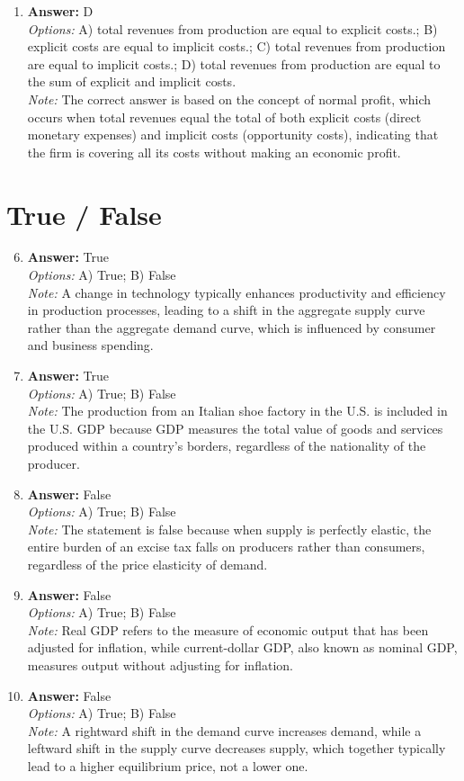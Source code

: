 \documentclass[12pt]{article}
\begin{document}
\begin{enumerate}[label=\arabic*.]
\item \textbf{Answer:} D
\\ \textit{Options:} A) total revenues from production are equal to explicit costs.; B) explicit costs are equal to implicit costs.; C) total revenues from production are equal to implicit costs.; D) total revenues from production are equal to the sum of explicit and implicit costs.
\\ \textit{Note:} The correct answer is based on the concept of normal profit, which occurs when total revenues equal the total of both explicit costs (direct monetary expenses) and implicit costs (opportunity costs), indicating that the firm is covering all its costs without making an economic profit.
\end{enumerate}

\section*{True / False}
\begin{enumerate}[label=\arabic*.]
\setcounter{enumi}{5}
\item \textbf{Answer:} True
\\ \textit{Options:} A) True; B) False
\\ \textit{Note:} A change in technology typically enhances productivity and efficiency in production processes, leading to a shift in the aggregate supply curve rather than the aggregate demand curve, which is influenced by consumer and business spending.
\item \textbf{Answer:} True
\\ \textit{Options:} A) True; B) False
\\ \textit{Note:} The production from an Italian shoe factory in the U.S. is included in the U.S. GDP because GDP measures the total value of goods and services produced within a country's borders, regardless of the nationality of the producer.
\item \textbf{Answer:} False
\\ \textit{Options:} A) True; B) False
\\ \textit{Note:} The statement is false because when supply is perfectly elastic, the entire burden of an excise tax falls on producers rather than consumers, regardless of the price elasticity of demand.
\item \textbf{Answer:} False
\\ \textit{Options:} A) True; B) False
\\ \textit{Note:} Real GDP refers to the measure of economic output that has been adjusted for inflation, while current-dollar GDP, also known as nominal GDP, measures output without adjusting for inflation.
\item \textbf{Answer:} False
\\ \textit{Options:} A) True; B) False
\\ \textit{Note:} A rightward shift in the demand curve increases demand, while a leftward shift in the supply curve decreases supply, which together typically lead to a higher equilibrium price, not a lower one.
\end{enumerate}
\end{document}
